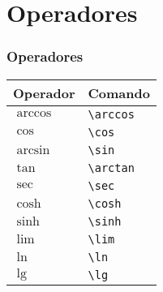 \documentclass[brazilian]{beamer}
\begin{document}
\section{Operadores}
\begin{frame}[fragile]
    \frametitle{Operadores}

    \begin{table}
        \begin{tabular}{O{1.5cm}l}
            Operador & Comando \\ \hline
            \(\arccos \) & \lstinline[style=myStyleLatex]!\arccos ! \\ \hline
            \(\cos \) & \lstinline[style=myStyleLatex]!\cos ! \\ \hline
            \(\arcsin \) & \lstinline[style=myStyleLatex]!\sin ! \\ \hline
            \(\tan \) & \lstinline[style=myStyleLatex]!\arctan ! \\ \hline
            \(\sec \) & \lstinline[style=myStyleLatex]!\sec ! \\ \hline
            \(\cosh \) & \lstinline[style=myStyleLatex]!\cosh ! \\ \hline
            \(\sinh \) & \lstinline[style=myStyleLatex]!\sinh ! \\ \hline
            \(\lim \) & \lstinline[style=myStyleLatex]!\lim ! \\ \hline
            \(\ln \) & \lstinline[style=myStyleLatex]!\ln ! \\ \hline
            \(\lg \) & \lstinline[style=myStyleLatex]!\lg ! \\ \hline
        \end{tabular}
    \end{table}

\end{frame}
\end{document}
